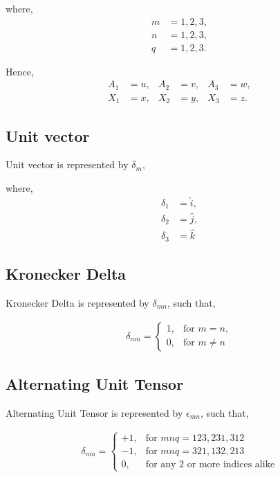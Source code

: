 \documentclass[fleqn,10pt]{SelfArx} %
\begin{document}
where, \vspace{-10pt}
\begin{align*}
	m & = 1,2,3, \\
	n & = 1,2,3, \\
	q & = 1,2,3.
\end{align*}

Hence, \vspace{-10pt}
\begin{align*}
	A_1 & = u, & A_2 & = v, & A_3 & = w, \\
	X_1 & = x, & X_2 & = y, & X_3 & = z.
\end{align*}

\subsection{Unit vector}
Unit vector is represented by $\delta_m$,

where, \vspace{-5pt}
\begin{align*}
	\delta_1 & = \hat{i}, \\
	\delta_2 & = \hat{j}, \\
	\delta_3 & = \hat{k}
\end{align*}

\subsection{Kronecker Delta}
Kronecker Delta is represented by $\delta_{mn}$, such that,

\begin{align*}
	\delta_{mn} =
	\begin{cases}
		1, & \text{for } m = n,   \\
		0, & \text{for } m \neq n
	\end{cases}
\end{align*}

\subsection{Alternating Unit Tensor}
Alternating Unit Tensor is represented by $\epsilon_{mn}$, such that,

\begin{align*}
	\delta_{mn} =
	\begin{cases}
		+1, & \text{for } mnq = 123,231,312          \\
		-1, & \text{for } mnq = 321,132,213          \\
		0,  & \text{for any 2 or more indices alike}
	\end{cases}
\end{align*}
\end{document}
